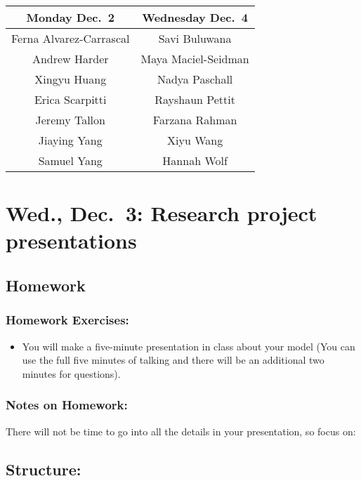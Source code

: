 \documentclass[
]{article}
\providecommand{\tightlist}{%
  \setlength{\itemsep}{0pt}\setlength{\parskip}{0pt}}
\begin{document}
\begin{longtable}[]{@{}cc@{}}
\toprule\noalign{}
Monday Dec.~2 & Wednesday Dec.~4 \\
\midrule\noalign{}
\endhead
\bottomrule\noalign{}
\endlastfoot
Ferna Alvarez-Carrascal & Savi Buluwana \\
Andrew Harder & Maya Maciel-Seidman \\
Xingyu Huang & Nadya Paschall \\
Erica Scarpitti & Rayshaun Pettit \\
Jeremy Tallon & Farzana Rahman \\
Jiaying Yang & Xiyu Wang \\
Samuel Yang & Hannah Wolf \\
\end{longtable}

\section{Wed., Dec.~3: Research project
presentations}\label{wed.-dec.-3-research-project-presentations}

\subsection{Homework}\label{homework-14}

\subsubsection{Homework Exercises:}\label{homework-exercises-14}

\begin{itemize}
\tightlist
\item
  You will make a five-minute presentation in class about your model
  (You can use the full five minutes of talking and there will be an
  additional two minutes for questions).
\end{itemize}

\subsubsection{Notes on Homework:}\label{notes-on-homework-10}

There will not be time to go into all the details in your presentation,
so focus on:

\subsection{Structure:}\label{structure-1}
\end{document}
